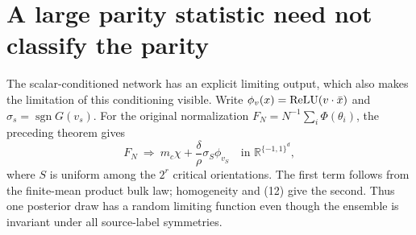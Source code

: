 \section{A large parity statistic need not classify the parity}
The scalar-conditioned network has an explicit limiting output, which
also makes the limitation of this conditioning visible. Write
$\phi_v(x)=\operatorname{ReLU}(v\cdot\bar x)$ and
$\sigma_s=\operatorname{sgn}G(v_s)$. For the original normalization
$F_N=N^{-1}\sum_i\Phi(\theta_i)$, the preceding theorem gives
\[
 F_N\ \Longrightarrow\ m_c\chi+
             \frac{\delta}{\rho}\sigma_S\phi_{v_S}
 \quad\text{in }\mathbb R^{\{-1,1\}^d},                 \tag{16}
\]
where $S$ is uniform among the $2^r$ critical orientations. The first
term follows from the finite-mean product bulk law; homogeneity and
(12) give the second. Thus one posterior draw has a random limiting
function even though the ensemble is invariant under all source-label
symmetries.


